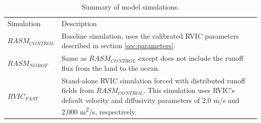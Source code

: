 \documentclass[jgrga, draft]{agutex}
\begin{document}
\begin{table}[]
  \caption{Summary of model simulations.}
  \label{table:simulations}
  \begin{tabular}{l|p{4in}}
  Simulation       & Description \\
  $RASM_{CONTROL}$ & Baseline simulation, uses the calibrated RVIC parameters described in section \ref{sec:parameters}. \\
  $RASM_{NOROF}$   & Same as $RASM_{CONTROL}$ except does not include the runoff flux from the land to the ocean. \\
  $RVIC_{FAST}$    & Stand-alone RVIC simulation forced with distributed runoff fields from $RASM_{CONTROL}$. This simulation uses RVIC's default velocity and diffusivity parameters of 2.0 m/s and 2,000 m\textsuperscript{2}/s, respectively.
  \end{tabular}
\end{table}


\begin{table}
  \caption{RVIC model performance statistics for the seven rivers shown in Figure \ref{fig:rasm_domain}. The overlap statistic is calculated using normalized hydrographs whereas the bias and RMSE are calculated using the unadjusted hydrographs.}
  \label{table:rivers}
\end{table}
\end{document}
